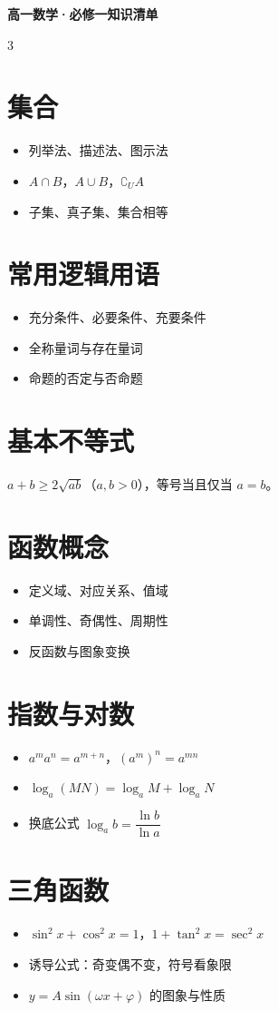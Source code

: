 \documentclass[8pt]{extarticle}
\providecommand{\complement}{\mathop{∁}}
\begin{document}
\begin{center}{\Large\bfseries 高一数学·必修一知识清单}\end{center}
\vspace{0.5ex}
\begin{multicols}{3}
\section{集合}
\begin{itemize}
\item 列举法、描述法、图示法
\item $A\cap B$，$A\cup B$，$\complement_U A$
\item 子集、真子集、集合相等
\end{itemize}
\section{常用逻辑用语}
\begin{itemize}
\item 充分条件、必要条件、充要条件
\item 全称量词与存在量词
\item 命题的否定与否命题
\end{itemize}
\section{基本不等式}
$a+b\ge 2\sqrt{ab}$（$a,b>0$），等号当且仅当 $a=b$。
\section{函数概念}
\begin{itemize}
\item 定义域、对应关系、值域
\item 单调性、奇偶性、周期性
\item 反函数与图象变换
\end{itemize}
\section{指数与对数}
\begin{itemize}
\item $a^m a^n=a^{m+n}$，$(a^m)^n=a^{mn}$
\item $\log_a(MN)=\log_a M+\log_a N$
\item 换底公式 $\log_a b=\dfrac{\ln b}{\ln a}$
\end{itemize}
\section{三角函数}
\begin{itemize}
\item $\sin^2x+\cos^2x=1$，$1+\tan^2x=\sec^2x$
\item 诱导公式：奇变偶不变，符号看象限
\item $y=A\sin(\omega x+\varphi)$ 的图象与性质
\end{itemize}

\end{multicols}
\end{document}

